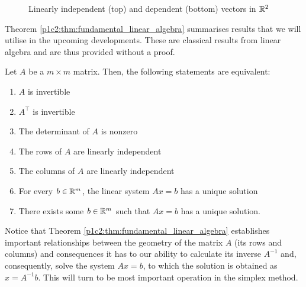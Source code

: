 \begin{figure}[h]
	\centering
	\caption{Linearly independent (top) and dependent (bottom) vectors in $\mathbb{R}^2$}
\end{figure}

Theorem \ref{p1c2:thm:fundamental_linear_algebra} summarises results that we will utilise in the upcoming developments. These are classical results from linear algebra and are thus provided without a proof.
%
\begin{theorem}[Inverses, linear independence, and solving $Ax = b$] \label{p1c2:thm:fundamental_linear_algebra}
	Let $A$ be a $m \times m$ matrix. Then, the following statements are equivalent:
	\begin{enumerate}
		\item $A$ is invertible
		\item $A^\top$ is invertible
		\item The determinant of $A$ is nonzero
		\item The rows of $A$ are linearly independent
		\item The columns of $A$ are linearly independent
		\item For every $b \in \mathbb{R}^m$, the linear system $Ax = b$ has a unique solution
		\item There exists some $b \in \mathbb{R}^m$ such that $Ax = b$ has a unique solution.	
	\end{enumerate}	
\end{theorem}
%
Notice that Theorem \ref{p1c2:thm:fundamental_linear_algebra} establishes important relationships between the geometry of the matrix $A$ (its rows and columns) and consequences it has to our ability to calculate its inverse $A^{-1}$ and, consequently, solve the system $Ax = b$, to which the solution is obtained as $x = A^{-1}b$. This will turn to be most important operation in the simplex method.


